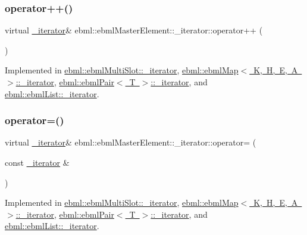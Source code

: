 \subsubsection{\texorpdfstring{operator++()}{operator++()}}
{\footnotesize\ttfamily virtual \mbox{\hyperlink{classebml_1_1ebmlMasterElement_1_1__iterator}{\+\_\+iterator}}\& ebml\+::ebml\+Master\+Element\+::\+\_\+iterator\+::operator++ (\begin{DoxyParamCaption}{ }\end{DoxyParamCaption})\hspace{0.3cm}{\ttfamily [pure virtual]}}



Implemented in \mbox{\hyperlink{classebml_1_1ebmlMultiSlot_1_1__iterator_a59e3bf809115c2ef28cbaf05c0d78afd}{ebml\+::ebml\+Multi\+Slot\+::\+\_\+iterator}}, \mbox{\hyperlink{classebml_1_1ebmlMap_1_1__iterator_aa35aad1b71670402a6152989c9b0cf6b}{ebml\+::ebml\+Map$<$ K, H, E, A $>$\+::\+\_\+iterator}}, \mbox{\hyperlink{classebml_1_1ebmlPair_1_1__iterator_a72dd1b1a818c44cc855f9340f3acbbe5}{ebml\+::ebml\+Pair$<$ T $>$\+::\+\_\+iterator}}, and \mbox{\hyperlink{classebml_1_1ebmlList_1_1__iterator_a48ccc42627bfcc8b681126603232f587}{ebml\+::ebml\+List\+::\+\_\+iterator}}.

\mbox{\label{classebml_1_1ebmlMasterElement_1_1__iterator_a849c5027957fa1a022de0417aea1ad9e}} 
\subsubsection{\texorpdfstring{operator=()}{operator=()}}
{\footnotesize\ttfamily virtual \mbox{\hyperlink{classebml_1_1ebmlMasterElement_1_1__iterator}{\+\_\+iterator}}\& ebml\+::ebml\+Master\+Element\+::\+\_\+iterator\+::operator= (\begin{DoxyParamCaption}\item[{const \mbox{\hyperlink{classebml_1_1ebmlMasterElement_1_1__iterator}{\+\_\+iterator}} \&}]{ }\end{DoxyParamCaption})\hspace{0.3cm}{\ttfamily [pure virtual]}}



Implemented in \mbox{\hyperlink{classebml_1_1ebmlMultiSlot_1_1__iterator_ae21fb8ce6820c3540dedf14eee28d24a}{ebml\+::ebml\+Multi\+Slot\+::\+\_\+iterator}}, \mbox{\hyperlink{classebml_1_1ebmlMap_1_1__iterator_af9aa2621f2b2d78c75a473b3c4b94fc4}{ebml\+::ebml\+Map$<$ K, H, E, A $>$\+::\+\_\+iterator}}, \mbox{\hyperlink{classebml_1_1ebmlPair_1_1__iterator_a2a77d98449db2fb4840d122f15da99be}{ebml\+::ebml\+Pair$<$ T $>$\+::\+\_\+iterator}}, and \mbox{\hyperlink{classebml_1_1ebmlList_1_1__iterator_a76134ca4a1212fcf2083fb5f3f6e7130}{ebml\+::ebml\+List\+::\+\_\+iterator}}.

